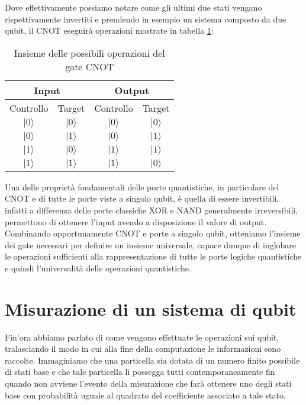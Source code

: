 Dove effettivamente possiamo notare come gli ultimi due stati vengano rispettivamente invertiti e prendendo in esempio un sistema composto da due qubit, il CNOT eseguirà operazioni mostrate in tabella \ref{tab:cnot}:

\begin{table}[htbp]
  \centering
  \begin{tabular}{|cc|cc|}
  \hline
  \multicolumn{2}{|c|}{Input} & \multicolumn{2}{c|}{Output} \\ \hline
  \multicolumn{1}{|c|}{Controllo} & Target & \multicolumn{1}{c|}{Controllo} & Target \\ \hline
  \multicolumn{1}{|c|}{\(|0\rangle\)} & \(|0\rangle\) & \multicolumn{1}{c|}{\(|0\rangle\)} & \(|0\rangle\) \\ \hline
  \multicolumn{1}{|c|}{\(|0\rangle\)} & \(|1\rangle\) & \multicolumn{1}{c|}{\(|0\rangle\)} & \(|1\rangle\) \\ \hline
  \multicolumn{1}{|c|}{\(|1\rangle\)} & \(|0\rangle\) & \multicolumn{1}{c|}{\(|1\rangle\)} & \(|1\rangle\) \\ \hline
  \multicolumn{1}{|c|}{\(|1\rangle\)} & \(|1\rangle\) & \multicolumn{1}{c|}{\(|1\rangle\)} & \(|0\rangle\) \\ \hline
  \end{tabular}
  \caption{Insieme delle possibili operazioni del gate CNOT}
  \label{tab:cnot}
\end{table}

Una delle proprietà fondamentali delle porte quantistiche, in particolare del CNOT e di tutte le porte viste a singolo qubit, è quella di essere invertibili, infatti a differenza delle porte classiche XOR e NAND generalmente irreversibili, permettono di ottenere l'input avendo a disposizione il valore di output. Combinando opportunamente CNOT e porte a singolo qubit, otteniamo l'insieme dei gate necessari per definire un insieme universale, capace dunque di inglobare le operazioni sufficienti alla rappresentazione di tutte le porte logiche quantistiche e quindi l'universalità delle operazioni quantistiche.

\section{Misurazione di un sistema di qubit}
Fin'ora abbiamo parlato di come vengono effettuate le operazioni sui qubit, tralasciando il modo in cui alla fine della computazione le informazioni sono raccolte. Immaginiamo che una particella sia dotata di un numero finito possibile di stati base e che tale particella li possegga tutti contemporaneamente fin quando non avviene l'evento della misurazione che farà ottenere uno degli stati base con probabilità uguale al quadrato del coefficiente associato a tale stato.

